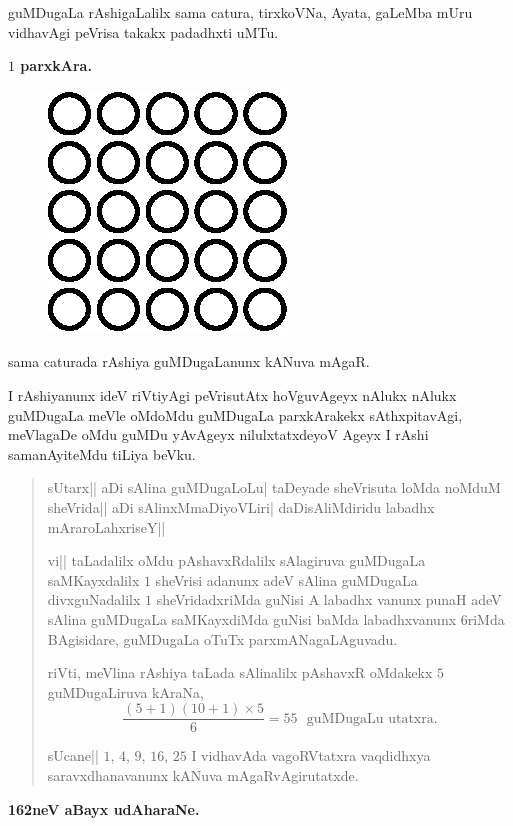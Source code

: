 guMDugaLa rAshigaLalilx sama catura, tirxkoVNa, Ayata, gaLeMba mUru
vidhavAgi peVrisa takakx padadhxti uMTu.

\medskip
\begin{center}
{\bf $1$ parxkAra.}
\end{center}

\begin{figure}[H]
\centering
\includegraphics{figure/fig40.eps}
\end{figure}

sama caturada rAshiya guMDugaLanunx kANuva mAgaR.

I rAshiyanunx ideV riVtiyAgi peVrisutAtx hoVguvAgeyx nAlukx nAlukx
guMDugaLa meVle oMdoMdu guMDugaLa parxkArakekx sAthxpitavAgi,
meVlagaDe oMdu guMDu yAvAgeyx nilulxtatxdeyoV Ageyx I rAshi
samanAyiteMdu tiLiya beVku.

\begin{verse}
sUtarx|| aDi sAlina guMDugaLoLu| taDeyade sheVrisuta loMda noMduM
sheVrida|| aDi sAlinxMmaDiyoVLiri| daDisAliMdiridu labadhx
mAraroLahxriseY|| 

vi|| taLadalilx oMdu pAshavxRdalilx sAlagiruva guMDugaLa saMKayxdalilx
$1$ sheVrisi adanunx adeV sAlina guMDugaLa divxguNadalilx $1$
sheVridadxriMda guNisi A labadhx vanunx punaH adeV sAlina guMDugaLa
saMKayxdiMda guNisi baMda labadhxvanunx $6$riMda BAgisidare, guMDugaLa
oTuTx parxmANagaLAguvadu.

riVti, meVlina rAshiya taLada sAlinalilx pAshavxR oMdakekx $5$
guMDugaLiruva kAraNa,
$$
\frac{(5+1)(10+1)\times 5}{6}=55\text{~ guMDugaLu utatxra.}
$$ 

sUcane|| $1$, $4$, $9$, $16$, $25$ I vidhavAda vagoRVtatxra vaqdidhxya
saravxdhanavanunx kANuva mAgaRvAgirutatxde.
\end{verse}

\medskip
\begin{center}
{\large\bf 162neV aBayx udAharaNe.}
\end{center}

